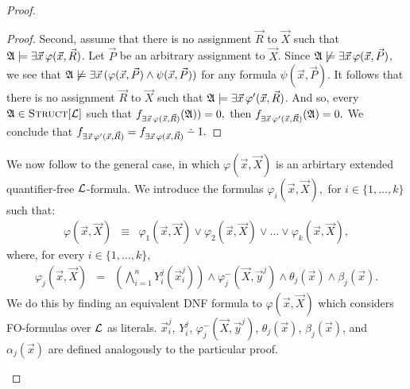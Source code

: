 \documentclass[12pt]{article}
\def\dotminus{\mathbin{\ooalign{\hss\raise1ex\hbox{.}\hss\cr
  \mathsurround=0pt$-$}}}
\def\Truc{\textsc{Struct}[\L]}
\def\A{{\frak A}}
\def\L{{\cal L}}
\def\P{\vec{P}}
\def\R{\vec{R}}
\def\X{\vec{X}}
\def\x{\vec{x}} %
\def\y{\vec{y}} %
\begin{document}
\begin{proof}
\begin{enumerate}
\begin{proof}
Second, assume that there is no assignment $\R$ to $\X$ such that $\A\models\exists\x\,\varphi(\x,\R)$. Let $\P$ be an arbitrary assignment to $\X$. Since $\A\not\models\exists\x\,\varphi(\x,\P)$, we see that $\A\not\models\exists\x\,(\varphi(\x,\P)\wedge\psi(\x,\P))$ for any formula $\psi(\x,\P)$. It follows that there is no assignment $\R$ to $\X$ such that $\A\models\exists\x\,\varphi^\prime(\x,\R)$. And so, every $\A\in\Truc$ such that $f_{\exists\x\,\varphi(\x,\R)}(\A))=0,$ then $f_{\exists\x\,\varphi^\prime(\x,\R)}(\A) = 0.$ We conclude that $f_{\exists\x\,\varphi^\prime(\x,\R)} = f_{\exists\x\,\varphi(\x,\R)}\dotminus 1.$
\end{proof}

We now follow to the general case, in which $\varphi(\x,\X)$ is an arbirtary extended quantifier-free $\L$-formula. We introduce the formulas $\varphi_i(\x,\X),$ for $i\in\{1,\dots,k\}$ such that:
\begin{eqnarray*}
\varphi(\x,\X) &\equiv& \varphi_1(\x,\X) \vee \varphi_2(\x,\X) \vee \dots  \vee \varphi_k(\x,\X),
\end{eqnarray*}
where, for every $i\in\{1,\ldots,k\}$,
\begin{eqnarray*}
\varphi_j(\x,\X) &=& \left( \bigwedge_{i=1}^n Y^j_i(\x^j_i) \right) \wedge \varphi^{-}_j(\X,\y^j) \wedge \theta_j(\x) \wedge \beta_j(\x).
\end{eqnarray*}
We do this by finding an equivalent DNF formula to $\varphi(\x,\X)$ which considers FO-formulas over $\L$ as literals. $\x^j_i$, $Y^j_i$, $\varphi^{-}_j(\X,\y^j)$, $\theta_j(\x)$, $\beta_j(\x)$, and $\alpha_j(\x)$ are defined analogously to the particular proof. 


\end{enumerate}
\end{proof}
\end{document}
